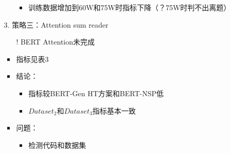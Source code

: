 \documentclass[11pt]{article}
\begin{document}
\begin{CJK}{UTF8}{gkai}
\begin{itemize}
\begin{itemize}
\begin{itemize}
      \begin{itemize}
        \item 训练数据增加到60W和75W时指标下降（？75W时判不出离题）
      \end{itemize}
    \end{itemize}
    \item [3.] 策略三：Attention sum reader
    \begin{itemize}
      \item [!] BERT Attention未完成
      \item 指标见表3
      \item 结论：
      \begin{itemize}
        \item 指标较BERT-Gen HT方案和BERT-NSP低
        \item $Dataset_2$和$Dataset_3$指标基本一致
      \end{itemize}
      \item 问题：
      \begin{itemize}
        \item 检测代码和数据集
      \end{itemize}
    \end{itemize}
  \end{itemize}
\end{itemize}


\end{CJK}
\end{document}
